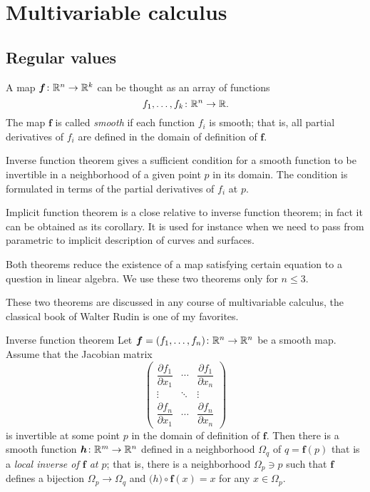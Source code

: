 \chapter{Multivariable calculus}

\section{Regular values}

A map $\bm{f}\colon\mathbb{R}^n\to\mathbb{R}^k$ can be thought as an array of functions 
\[f_1,\dots,f_k\colon\mathbb{R}^n\to \mathbb{R}.\]
The map $\bm{f}$ is called \emph{smooth} if each function $f_i$ is smooth;
that is, all partial derivatives of $f_i$ are defined in the domain of definition of $\bm{f}$.

Inverse function theorem gives a sufficient condition for a smooth function to be invertible in a neighborhood of a given point $p$ in its domain.
The condition is formulated in terms of the partial derivatives of $f_i$ at $p$.

Implicit function theorem is a close relative to inverse function theorem;
in fact it can be obtained as its corollary.
It is used for instance when we need to pass from parametric to implicit description of curves and surfaces.

Both theorems reduce the existence of a map satisfying certain equation to a question in linear algebra. 
We use these two theorems only for $n\le 3$.

These two theorems are discussed in any course of multivariable calculus, the classical book of Walter Rudin \cite{rudin} is one of my favorites.

\begin{thm}{Inverse function theorem}\label{thm:inverse}
Let $\bm{f}=(f_1,\dots,f_n)\colon\mathbb{R}^n\to\mathbb{R}^n$ be a smooth map.
Assume that the Jacobian matrix
\[
\begin{pmatrix}
\dfrac{\partial f_1}{\partial x_1} & \cdots & \dfrac{\partial f_1}{\partial x_n}\\
\vdots & \ddots & \vdots\\
\dfrac{\partial f_n}{\partial x_1} & \cdots & \dfrac{\partial f_n}{\partial x_n} \end{pmatrix}\]
is invertible at some point $p$ in the domain of definition of $\bm{f}$.
Then there is a smooth function $\bm{h}\colon\mathbb{R}^m\to\mathbb{R}^n$ defined in a neighborhood $\Omega_q$ of $q=\bm{f}(p)$ that is a \emph{local inverse of $\bm{f}$ at $p$};
that is, there is a neighborhood $\Omega_p\ni p$ such that
$\bm{f}$ defines a bijection $\Omega_p\to \Omega_q$ and
$\bm(h) \circ \bm{f}(x)=x$ for any $x\in \Omega_p$.
\end{thm}

